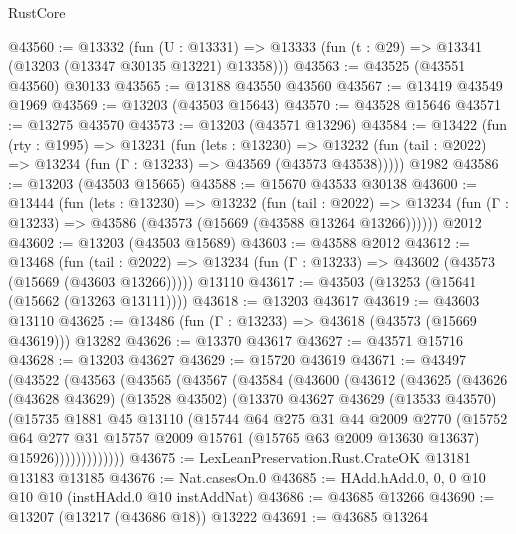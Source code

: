 \begin{lexlean}{RustCore}
\begin{coremodule}
@43560 := @13332
    (fun (U : @13331) => @13333 (fun (t : @29) => @13341 (@13203 (@13347 @30135 @13221) @13358)))
@43563 := @43525 (@43551 @43560) @30133
@43565 := @13188 @43550 @43560
@43567 := @13419 @43549 @1969
@43569 := @13203 (@43503 @15643)
@43570 := @43528 @15646
@43571 := @13275 @43570
@43573 := @13203 (@43571 @13296)
@43584 := @13422
    (fun (rty : @1995) =>
    @13231
      (fun (lets : @13230) =>
      @13232 (fun (tail : @2022) => @13234 (fun (Γ : @13233) => @43569 (@43573 @43538)))))
    @1982
@43586 := @13203 (@43503 @15665)
@43588 := @15670 @43533 @30138
@43600 := @13444
    (fun (lets : @13230) =>
    @13232
      (fun (tail : @2022) =>
      @13234 (fun (Γ : @13233) => @43586 (@43573 (@15669 (@43588 @13264 @13266))))))
    @2012
@43602 := @13203 (@43503 @15689)
@43603 := @43588 @2012
@43612 := @13468
    (fun (tail : @2022) => @13234 (fun (Γ : @13233) => @43602 (@43573 (@15669 (@43603 @13266)))))
    @13110
@43617 := @43503 (@13253 (@15641 (@15662 (@13263 @13111))))
@43618 := @13203 @43617
@43619 := @43603 @13110
@43625 := @13486 (fun (Γ : @13233) => @43618 (@43573 (@15669 @43619))) @13282
@43626 := @13370 @43617
@43627 := @43571 @15716
@43628 := @13203 @43627
@43629 := @15720 @43619
@43671 := @43497
    (@43522
      (@43563
        (@43565
          (@43567
            (@43584
              (@43600
                (@43612
                  (@43625
                    (@43626
                      (@43628 @43629)
                      (@13528 @43502)
                      (@13370
                        @43627
                        @43629
                        (@13533 @43570)
                        (@15735
                          @1881
                          @45
                          @13110
                          (@15744
                            @64
                            @275
                            @31
                            @44
                            @2009
                            @2770
                            (@15752
                              @64
                              @277
                              @31
                              @15757
                              @2009
                              @15761
                              (@15765 @63 @2009 @13630 @13637)
                              @15926)))))))))))))
@43675 := LexLeanPreservation.Rust.CrateOK @13181 @13183 @13185
@43676 := Nat.casesOn.{0}
@43685 := HAdd.hAdd.{0, 0, 0} @10 @10 @10 (instHAdd.{0} @10 instAddNat)
@43686 := @43685 @13266
@43690 := @13207 (@13217 (@43686 @18)) @13222
@43691 := @43685 @13264

\end{coremodule}
\end{lexlean}
